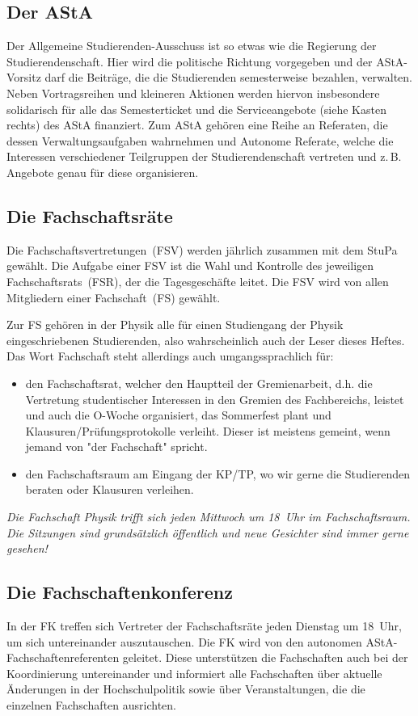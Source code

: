 \begin{multicols*}{2}
\subsection{Der AStA}
Der Allgemeine Studierenden-Ausschuss ist so etwas wie die Regierung der Studierendenschaft.
Hier wird die politische Richtung vorgegeben und der AStA-Vorsitz darf die Beiträge, die die Studierenden semesterweise bezahlen, verwalten.
Neben Vortragsreihen und kleineren Aktionen werden hiervon insbesondere solidarisch für alle das Semesterticket und die Serviceangebote (siehe Kasten rechts) des AStA finanziert. Zum AStA gehören eine Reihe an Referaten, die dessen Verwaltungsaufgaben wahrnehmen und Autonome Referate, welche die Interessen verschiedener Teilgruppen der Studierendenschaft vertreten und z.\,B. Angebote genau für diese organisieren.

\subsection{Die Fachschaftsräte}
Die Fachschaftsvertretungen~(FSV) werden jährlich zusammen mit dem StuPa gewählt.
Die Aufgabe einer FSV ist die Wahl und Kontrolle des jeweiligen Fachschaftsrats~(FSR), der die Tagesgeschäfte leitet.
Die FSV wird von allen Mitgliedern einer Fachschaft~(FS) gewählt.

Zur FS gehören in der Physik alle für einen Studiengang der Physik eingeschriebenen Studierenden, also wahrscheinlich auch der Leser dieses Heftes.
Das Wort Fachschaft steht allerdings auch umgangssprachlich für:
\begin{itemize}
	\item den Fachschaftsrat, welcher den Hauptteil der Gremienarbeit, d.h. die Vertretung studentischer Interessen in den Gremien des Fachbereichs, leistet und auch die O-Woche organisiert, das Sommerfest plant und Klausuren/Prüfungsprotokolle verleiht.
Dieser ist meistens gemeint, wenn jemand von "der Fachschaft" spricht.
	\item den Fachschaftsraum am Eingang der KP/TP, wo wir gerne die Studierenden beraten oder Klausuren verleihen.
\end{itemize}
\emph{Die Fachschaft Physik trifft sich jeden Mittwoch um 18~Uhr im Fachschaftsraum.
Die Sitzungen sind grundsätzlich öffentlich und neue Gesichter sind immer gerne gesehen!}

\subsection{Die Fachschaftenkonferenz}
In der FK treffen sich Vertreter der Fachschaftsräte jeden Dienstag um 18~Uhr, um sich untereinander auszutauschen.
Die FK wird von den autonomen AStA-Fachschaftenreferenten geleitet.
Diese unterstützen die Fachschaften auch bei der Koordinierung untereinander und informiert alle Fachschaften über aktuelle Änderungen in der Hochschulpolitik sowie über Veranstaltungen, die die einzelnen Fachschaften ausrichten.

\end{multicols*}

